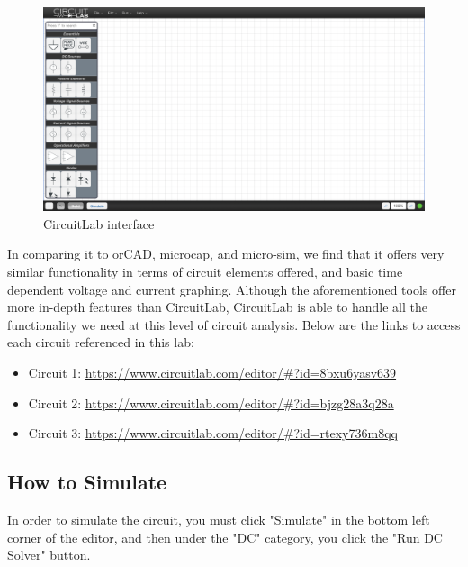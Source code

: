 \documentclass[12pt]{article}
\begin{document}
\begin{figure}[H]
    \begin{center}
        \includegraphics[scale=0.3]{circuit-lab.png}
        \caption { CircuitLab interface}
    \end{center}
\end{figure}

In comparing it to orCAD, microcap, and micro-sim, we find that it offers very similar functionality in terms of circuit elements offered, and basic time dependent voltage and current graphing. Although the aforementioned tools offer more in-depth features than CircuitLab, CircuitLab is able to handle all the functionality we need at this level of circuit analysis.
Below are the links to access each circuit referenced in this lab:

\begin{itemize}
    \item Circuit 1: \url{https://www.circuitlab.com/editor/#?id=8bxu6yasv639}
    \item Circuit 2: \url{https://www.circuitlab.com/editor/#?id=bjzg28a3q28a}
    \item Circuit 3: \url{https://www.circuitlab.com/editor/#?id=rtexy736m8qq}
  \end{itemize}

\pagebreak

\subsection{How to Simulate}
In order to simulate the circuit, you must click "Simulate" in the bottom left corner of the editor, and then under the "DC" category, you click the "Run DC Solver" button.
\end{document}
